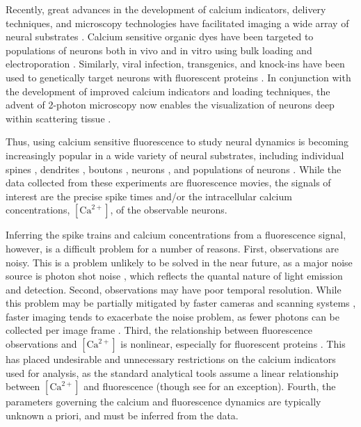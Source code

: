 \documentclass[10pt]{article}
\newcommand{\Ca}{[\text{Ca}^{2+}]}
\begin{document}
Recently, great advances in the development of calcium indicators, delivery techniques, and microscopy technologies have facilitated imaging a wide array of neural substrates \cite{ImagingManual}. Calcium sensitive organic dyes \cite{Tsien81, YusteKatz91} have been targeted to populations of neurons both in vivo and in vitro using bulk loading  \cite{BrusteinKonnerth03, StosiekKonnerth03} and electroporation  \cite{NagayamaChen07, NevianHelmchen07}.  Similarly, viral infection, transgenics, and knock-ins have been used to genetically target neurons with fluorescent proteins \cite{MiyawakiTsien97, GriesbeckTsien01, NakaiImoto01%
} . In conjunction with the development of improved calcium indicators and loading techniques, the advent of 2-photon microscopy now enables the visualization of neurons deep within scattering tissue \cite{DenkWebb90, OheimCharpak01, TheerDenk03, FlusbergSchnitzer05a}.

Thus, using calcium sensitive fluorescence to study neural dynamics is becoming increasingly popular in a wide variety of neural substrates, including individual spines \cite{MullerConnor91, YusteDenk95, EngertBonhoeffer99, NimchinskySvoboda04}, dendrites \cite{MajewskaYuste00, ScheussSvoboda06, SdrullaLinden07}, boutons \cite{MajewskaSur06, BrenowitzRegehr07}, neurons \cite{HelmchenSakmann96, SvobodaDenk96, MaravallSvoboda00}, and populations of neurons \cite{O'MalleyFetcho96, SmettersYuste99, IkegayaYuste04, NiellSmith05, OhkiReid05, OhkiReid06, YaksiFriedrich07, NagayamaChen07, SatoSvoboda07, RootWang07}. While the data collected from these experiments are fluorescence movies, the signals of interest are the precise spike times and/or the intracellular calcium concentrations, $\Ca$, of the observable neurons.

Inferring the spike trains and calcium concentrations from a fluorescence signal, however, is a difficult problem for a number of reasons.  First, observations are noisy.  This is a problem unlikely to be solved in the near future, as a major noise source is photon shot noise \cite{SjulsonMiesenbock07}, which reflects the quantal nature of light emission and detection. Second, observations may have poor temporal resolution.  While this problem may be partially mitigated by faster cameras and scanning systems \cite{FlusbergSchnitzer05a,FanEllisman99, NguyenParker01, IyerSaggau06}, faster imaging tends to exacerbate the noise problem, as fewer photons can be collected per image frame \cite{SjulsonMiesenbock07}.  Third, the relationship between fluorescence observations and $\Ca$ is nonlinear, especially for fluorescent proteins \cite{PologrutoSvoboda04, TayYue07}.  This has placed undesirable and unnecessary restrictions on the calcium indicators used for analysis, as the standard analytical tools assume a linear relationship between $\Ca$ and fluorescence \cite{YasudaSvoboda04, ReiffBorst05, YaksiFriedrich06, SjulsonMiesenbock07} (though see \cite{BorstAbarbanel07} for an exception). Fourth, the parameters governing the calcium and fluorescence dynamics are typically unknown a priori, and must be inferred from the data.
\end{document}
